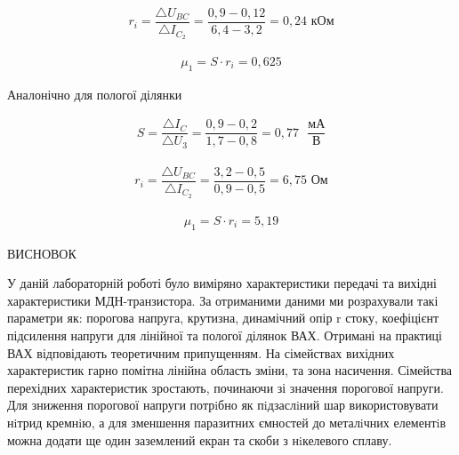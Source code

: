 \documentclass[a4paper,14pt]{extreport}
\begin{document}
\begin{align}\label{q2}
  r_i = \dfrac{\triangle U_{BC}}{\triangle I_{C_2}} =\dfrac{0,9-0,12}{6,4-3,2} = 0,24 \text{ кОм}
\end{align}

\begin{align}\label{q3}
  \mu_1 = S\cdot r_i = 0,625
\end{align}

Аналонічно для пологої ділянки

\begin{align}\label{q4}
  S = \dfrac{\triangle I_C}{\triangle U_{\text{3}}} = \dfrac{0,9-0,2}{1,7-0,8}= 0,77 \text{ } \dfrac{\text{мА}}{\text{В}}
\end{align}

\begin{align}\label{q5}
  r_i = \dfrac{\triangle U_{BC}}{\triangle I_{C_2}} = \dfrac{3,2-0,5}{0,9-0,5}= 6,75 \text{ Ом}
\end{align}

\begin{align}\label{q6}
  \mu_1 = S\cdot r_i = 5,19
\end{align}





\newpage
\begin{center} ВИСНОВОК \end{center}
У даній лабораторній роботі було виміряно характеристики передачі та вихідні характеристики МДН-транзистора. За отриманими даними ми розрахували такі параметри як: порогова напруга, крутизна, динамічний опір r стоку, коефіцієнт підсилення напруги для лінійної та пологої ділянок ВАХ. Отримані на практиці ВАХ відповідають теоретичним припущенням. На сімействах вихідних характеристик гарно помітна лінійна область зміни, та зона насичення. Сімейства перехідних характеристик зростають, починаючи зі значення порогової напруги. Для зниження порогової напруги потрiбно
як пiдзаслiний шар використовувати нiтрид кремнiю, а для зменшення
паразитних ємностей до металiчних елементiв можна додати ще один заземлений екран та скоби з нiкелевого сплаву.





\end{document}
